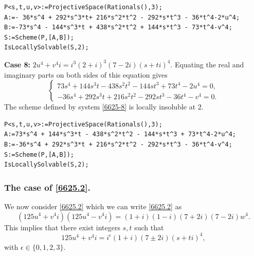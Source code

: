 \documentclass[a4paper,12pt,english,reqno]{amsart}
\begin{document}

\begin{lstlisting}
P<s,t,u,v>:=ProjectiveSpace(Rationals(),3);
A:=- 36*s^4 + 292*s^3*t+ 216*s^2*t^2 - 292*s*t^3 - 36*t^4-2*u^4;
B:=-73*s^4 - 144*s^3*t + 438*s^2*t^2 + 144*s*t^3 - 73*t^4-v^4;
S:=Scheme(P,[A,B]);
IsLocallySolvable(S,2);
\end{lstlisting}


{\bf Case 8:} $2u^4+v^4i=i^3(2+i)^3(7-2i)(s+ti)^4$. Equating the real and imaginary parts on both sides of this equation gives
\begin{equation}\label{6625-8}
\begin{cases}
73s^4 + 144s^3t - 438s^2t^2 - 144st^3 + 73t^4 - 2u^4=0,\\
-36s^4 + 292s^3t + 216s^2t^2 - 292st^3 - 36t^4 - v^4=0.
\end{cases}
\end{equation}
The scheme defined by system \eqref{6625-8} is locally insoluble at $2$.


\begin{lstlisting}
P<s,t,u,v>:=ProjectiveSpace(Rationals(),3);
A:=73*s^4 + 144*s^3*t - 438*s^2*t^2 - 144*s*t^3 + 73*t^4-2*u^4;
B:=-36*s^4 + 292*s^3*t + 216*s^2*t^2 - 292*s*t^3 - 36*t^4-v^4;
S:=Scheme(P,[A,B]);
IsLocallySolvable(S,2);
\end{lstlisting}


\subsubsection{\bf{The case of \eqref{6625.2}.}}%
We now consider \eqref{6625.2} which we can write \eqref{6625.2} as
\begin{equation} (125u^4+v^4i)(125u^4-v^4i)=(1+i)(1-i)(7+2i)(7-2i)w^4.
\end{equation}
This implies that there exist integers $s,t$ such that 
\[125u^4+v^4i=i^{\epsilon}(1+i)(7\pm 2i)(s+ti)^4,\]
with $\epsilon \in \{0,1,2,3\}$.
\end{document}
